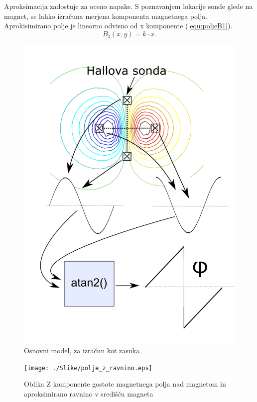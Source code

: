 Aproksimacija zadostuje za oceno napake. S poznavanjem lokacije sonde glede na magnet, se lahko izračuna merjena komponenta magnetnega polja. Aprokisimirano polje je linearno odvisno od x komponente (\ref{equ:poljeB1}).
\begin{equation}
\label{equ:poljeB1}
B_z(x,y)=k\cdot x.
\end{equation} 
\begin{figure}[ht]
	\centering
	\includegraphics[width=0.9\columnwidth]{./Slike/opis_modela.png}
	\caption{Osnovni model, za izračun kot zasuka}
	\label{opis_modela}
\end{figure}
\begin{figure}[ht]
	\centering
	\texttt{[image: ./Slike/polje\_z\_ravnino.eps]}
	\caption{Oblika Z komponente gostote magnetnega polja nad magnetom in aproksimirano ravnino v središču magneta}
	\label{polje_z_ravnino}
\end{figure}